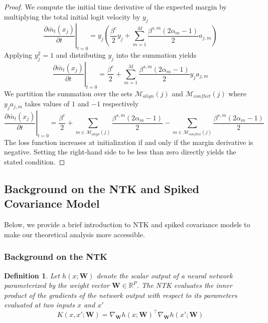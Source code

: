 \documentclass[letter,11pt]{article}
\newtheorem{definition}{Definition}
\begin{document}
\begin{proof}
We compute the initial time derivative of the expected margin by multiplying the total initial logit velocity by $y_j$
\begin{equation}
\left. \frac{\partial \bar{m}_t(x_j)}{\partial t} \right|_{t=0} = y_j \left( \frac{\beta^c}{2} y_j + \sum_{m=1}^M \frac{\beta^{s,m}(2\alpha_m - 1)}{2} a_{j,m} \right)
\end{equation}
Applying $y_j^2 = 1$ and distributing $y_j$ into the summation yields
\begin{equation}
\left. \frac{\partial \bar{m}_t(x_j)}{\partial t} \right|_{t=0} = \frac{\beta^c}{2} + \sum_{m=1}^M \frac{\beta^{s,m}(2\alpha_m - 1)}{2} y_j a_{j,m}
\end{equation}
We partition the summation over the sets $\mathcal{M}_{align}(j)$ and $\mathcal{M}_{conflict}(j)$ where $y_j a_{j,m}$ takes values of $1$ and $-1$ respectively
\begin{equation}
\left. \frac{\partial \bar{m}_t(x_j)}{\partial t} \right|_{t=0} = \frac{\beta^c}{2} + \sum_{m \in \mathcal{M}_{align}(j)} \frac{\beta^{s,m}(2\alpha_m - 1)}{2} - \sum_{m \in \mathcal{M}_{conflict}(j)} \frac{\beta^{s,m}(2\alpha_m - 1)}{2}
\end{equation}
The loss function  increases at initialization if and only if the margin derivative is  negative. Setting the right-hand side to be less than zero directly yields the stated condition.
\end{proof}



\subsection{Background on the NTK and Spiked Covariance Model}

Below, we provide a brief introduction to NTK and spiked covariance models to make our theoretical analysis more accessible.

\subsubsection{Background on the NTK}
\begin{definition}
Let $h(x; \mathbf{W})$ denote the scalar output of a neural network parameterized by the weight vector $\mathbf{W} \in \mathbb{R}^P$. The NTK evaluates the inner product of the gradients of the network output with respect to its parameters evaluated at two inputs $x$ and $x'$
\begin{equation}
K(x, x'; \mathbf{W}) = \nabla_{\mathbf{W}} h(x; \mathbf{W})^\top \nabla_{\mathbf{W}} h(x'; \mathbf{W})
\end{equation}
\end{definition}
\end{document}

